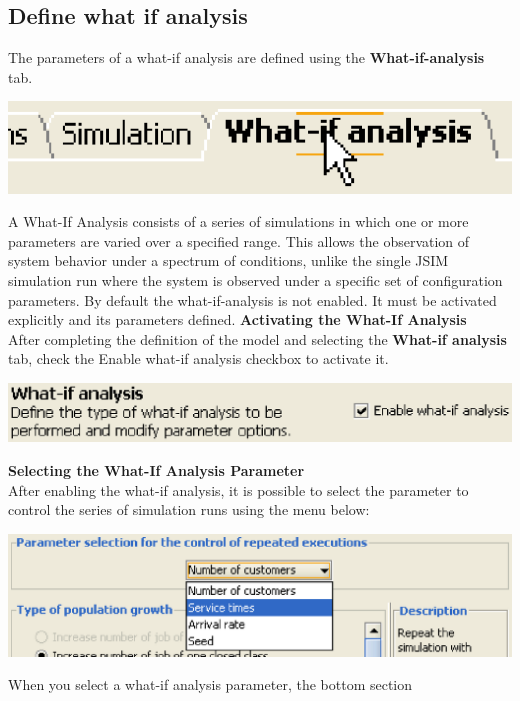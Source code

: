 \subsection{Define what if analysis}
\label{sec:DefineWhatIfAnalysis}
The parameters of a what-if analysis are defined using the \textbf{What-if-analysis} tab.
\begin{center}
\includegraphics[scale=.5]{img/jsim/whatif_tab.eps}
\end{center}
A What-If Analysis consists of a series of simulations in which one or more parameters are varied over a specified range. This allows the observation of system behavior under a spectrum of conditions, unlike the single JSIM simulation run where the system is observed under a specific set of configuration parameters.
By default the what-if-analysis is not enabled. It must be activated explicitly and its parameters defined.
\textbf{Activating the What-If Analysis }\\
After completing the definition of the model and selecting the \textbf{What-if analysis} tab, check the Enable what-if analysis checkbox to activate it.
\begin{center}
\includegraphics[scale=.5]{img/jsim/enable_box.eps}
\end{center}
\textbf{Selecting the What-If Analysis Parameter}\\
After enabling the what-if analysis, it is possible to select the parameter to control the series of simulation runs using the menu below:
\begin{center}
\includegraphics[scale=.5]{img/jsim/type_selection.eps}
\end{center}
When you select a what-if analysis parameter, the bottom section
